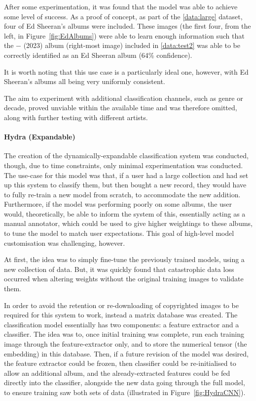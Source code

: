                 After some experimentation, it was found that the model was able to achieve some level of success. As a proof of concept, as part of the \ref{data:large} dataset, four of Ed Sheeran's albums were included. These images (the first four, from the left, in Figure~\ref{fig:EdAlbums}) were able to learn enough information such that the − (2023) album (right-most image) included in \ref{data:test2} was able to be correctly identified as an Ed Sheeran album (64\% confidence).
    
                It is worth noting that this use case is a particularly ideal one, however, with Ed Sheeran's albums all being very uniformly consistent.
    
                The aim to experiment with additional classification channels, such as genre or decade, proved unviable within the available time and was therefore omitted, along with further testing with different artists.
    
                \paragraph{Hydra (Expandable)}
    
                The creation of the dynamically-expandable classification system was conducted, though, due to time constraints, only minimal experimentation was conducted. The use-case for this model was that, if a user had a large collection and had set up this system to classify them, but then bought a new record, they would have to fully re-train a new model from scratch, to accommodate the new addition. Furthermore, if the model was performing poorly on some albums, the user would, theoretically, be able to inform the system of this, essentially acting as a manual annotator, which could be used to give higher weightings to these albums, to tune the model to match user expectations. This goal of high-level model customisation was challenging, however.
    
                At first, the idea was to simply fine-tune the previously trained models, using a new collection of data. But, it was quickly found that catastrophic data loss occurred when altering weights without the original training images to validate them.
    
                In order to avoid the retention or re-downloading of copyrighted images to be required for this system to work, instead a matrix database was created. The classification model essentially has two components: a feature extractor and a classifier. The idea was to, once initial training was complete, run each training image through the feature-extractor only, and to store the numerical tensor (the embedding) in this database. Then, if a future revision of the model was desired, the feature extractor could be frozen, then classifier could be re-initialised to allow an additional album, and the already-extracted features could be fed directly into the classifier, alongside the new data going through the full model, to ensure training saw both sets of data (illustrated in Figure~\ref{fig:HydraCNN}).
    
